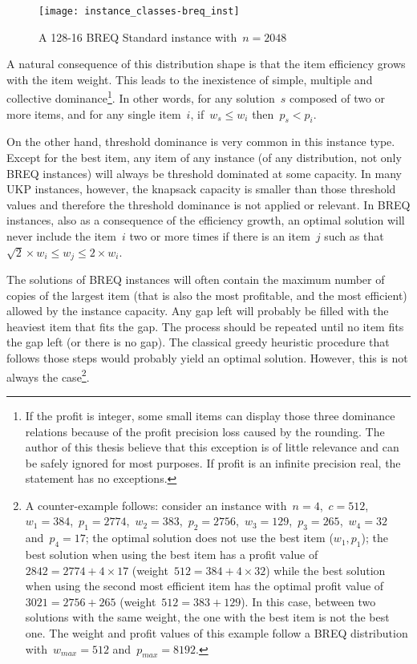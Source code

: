\begin{figure}[h]
\caption{A 128-16 BREQ Standard instance with~\(n = 2048\)}
\begin{center}
\texttt{[image: instance\_classes-breq\_inst]}
\end{center}
\label{fig:breq_example}
\end{figure}

A natural consequence of this distribution shape is that the item efficiency grows with the item weight.
This leads to the inexistence of simple, multiple and collective dominance\footnote{If the profit is integer, some small items can display those three dominance relations because of the profit precision loss caused by the rounding.
The author of this thesis believe that this exception is of little relevance and can be safely ignored for most purposes.
If profit is an infinite precision real, the statement has no exceptions.}.
In other words, for any solution~\(s\) composed of two or more items, and for any single item~\(i\), if~\(w_s \leq w_i\) then~\(p_s < p_i\).

On the other hand, threshold dominance is very common in this instance type.
Except for the best item, any item of any instance (of any distribution, not only BREQ instances) will always be threshold dominated at some capacity.
In many UKP instances, however, the knapsack capacity is smaller than those threshold values and therefore the threshold dominance is not applied or relevant.
In BREQ instances, also as a consequence of the efficiency growth, an optimal solution will never include the item~\(i\) two or more times if there is an item~\(j\) such as that~\(\sqrt{2} \times w_i \leq w_j \leq 2 \times w_i\).

The solutions of BREQ instances will often contain the maximum number of copies of the largest item (that is also the most profitable, and the most efficient) allowed by the instance capacity.
Any gap left will probably be filled with the heaviest item that fits the gap. The process should be repeated until no item fits the gap left (or there is no gap).
The classical greedy heuristic procedure that follows those steps would probably yield an optimal solution.
However, this is not always the case\footnote{A counter-example follows: consider an instance with~\(n = 4\),~\(c = 512\),~\(w_1 = 384\),~\(p_1 = 2774\),~\(w_2 = 383\),~\(p_2 = 2756\),~\(w_3 = 129\),~\(p_3 = 265\),~\(w_4 = 32\) and~\(p_4 = 17\); the optimal solution does not use the best item (\(w_1, p_1\)); the best solution when using the best item has a profit value of~\(2842 = 2774 + 4\times17\) (weight~\(512 = 384 + 4\times32\)) while the best solution when using the second most efficient item has the optimal profit value of~\(3021 = 2756 + 265\) (weight~\(512 = 383 + 129\)).
In this case, between two solutions with the same weight, the one with the best item is not the best one.
The weight and profit values of this example follow a BREQ distribution with~\(w_{max} = 512\) and~\(p_{max} = 8192\).}.


